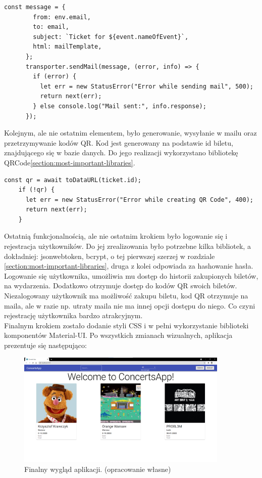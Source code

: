 \documentclass[12pt]{article}
\begin{document}
\begin{sloppypar}
{\begin{lstlisting}[caption=Kod odpowiadający za wysyłanie emaili., captionpos=b]
      const message = {
        from: env.email,
        to: email,
        subject: `Ticket for ${event.nameOfEvent}`,
        html: mailTemplate,
      };
      transporter.sendMail(message, (error, info) => {
        if (error) {
          let err = new StatusError("Error while sending mail", 500);
          return next(err);
        } else console.log("Mail sent:", info.response);
      });
  \end{lstlisting}
  Kolejnym, ale nie ostatnim elementem, było generowanie, wysyłanie w mailu oraz przetrzymywanie kodów QR. 
  Kod jest generowany na podstawie id biletu, znajdującego się w bazie danych. 
  Do jego realizacji wykorzystano bibliotekę QRCode\ref{section:most-important-libraries}.
  \begin{lstlisting}[caption=Kod odpowiadający za generowanie kodów QR., captionpos=b]
    const qr = await toDataURL(ticket.id);
    if (!qr) {
      let err = new StatusError("Error while creating QR Code", 400);
      return next(err);
    }
  \end{lstlisting}
  Ostatnią funkcjonalnością, ale nie ostatnim krokiem było logowanie się i rejestracja użytkowników. 
  Do jej zrealizowania było potrzebne kilka bibliotek, a dokładniej: jsonwebtoken, bcrypt, o tej pierwszej szerzej w rozdziale \ref{section:most-important-libraries}, 
  druga z kolei odpowiada za hashowanie hasła.
  Logowanie się użytkownika, umożliwia mu dostęp do historii zakupionych biletów, na wydarzenia. Dodatkowo otrzymuje dostęp do kodów QR swoich biletów. 
  Niezalogowany użytkownik ma możliwość zakupu biletu, kod QR otrzymuje na maila, ale w razie np. utraty maila nie ma innej opcji dostępu do niego. 
  Co czyni rejestrację użytkownika bardzo atrakcyjnym.\\
  Finalnym krokiem zostało dodanie styli CSS i w pełni wykorzystanie biblioteki komponentów Material-UI. 
  Po wszystkich zmianach wizualnych, aplikacja prezentuje się następująco:
  \begin{figure}[H]
    \centering
    \includegraphics[width=0.9\textwidth]{client_app/home.png}
    \caption{Finalny wygląd aplikacji. (opracowanie własne)}
    \label{fig:final-view}
  \end{figure}
}


\end{sloppypar}
\end{document}
